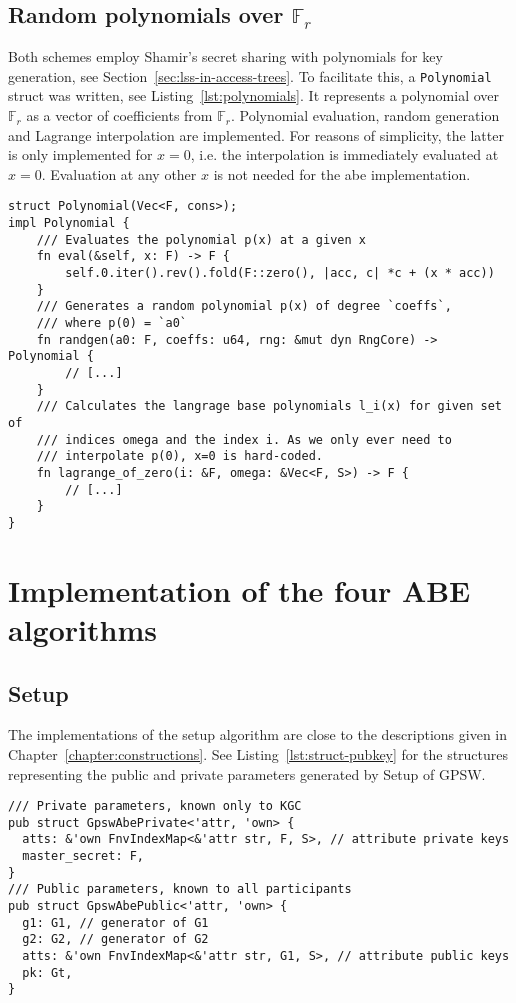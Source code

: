 \subsection{Random polynomials over $\mathbb{F}_r$}

Both schemes employ Shamir's secret sharing with polynomials for key generation, see Section~\ref{sec:lss-in-access-trees}.
To facilitate this, a \texttt{Polynomial} struct was written, see Listing~\ref{lst:polynomials}.
It represents a polynomial over $\mathbb{F}_r$ as a vector of coefficients from $\mathbb{F}_r$.
Polynomial evaluation, random generation and Lagrange interpolation are implemented.
For reasons of simplicity, the latter is only implemented for $x=0$, i.e. the interpolation is immediately evaluated at $x=0$.
Evaluation at any other $x$ is not needed for the \acrshort{abe} implementation.

\begin{lstlisting}[caption={Implementation of polynomials over $\mathbb{F}_r$},label={lst:polynomials}]
struct Polynomial(Vec<F, cons>);
impl Polynomial {
    /// Evaluates the polynomial p(x) at a given x
    fn eval(&self, x: F) -> F {
        self.0.iter().rev().fold(F::zero(), |acc, c| *c + (x * acc))
    }
    /// Generates a random polynomial p(x) of degree `coeffs`,
    /// where p(0) = `a0`
    fn randgen(a0: F, coeffs: u64, rng: &mut dyn RngCore) -> Polynomial {
        // [...]
    }
    /// Calculates the langrage base polynomials l_i(x) for given set of
    /// indices omega and the index i. As we only ever need to
    /// interpolate p(0), x=0 is hard-coded.
    fn lagrange_of_zero(i: &F, omega: &Vec<F, S>) -> F {
        // [...]
    }
}
\end{lstlisting}

\section{Implementation of the four ABE algorithms}
\subsection{Setup}
The implementations of the setup algorithm are close to the descriptions given in Chapter~\ref{chapter:constructions}.
See Listing~\ref{lst:struct-pubkey} for the structures representing the public and private parameters generated by Setup of GPSW.

\begin{lstlisting}[caption={Private and public system parameters structs for GPSW},label={lst:struct-pubkey}]
/// Private parameters, known only to KGC
pub struct GpswAbePrivate<'attr, 'own> {
  atts: &'own FnvIndexMap<&'attr str, F, S>, // attribute private keys
  master_secret: F,
}
/// Public parameters, known to all participants
pub struct GpswAbePublic<'attr, 'own> {
  g1: G1, // generator of G1
  g2: G2, // generator of G2
  atts: &'own FnvIndexMap<&'attr str, G1, S>, // attribute public keys
  pk: Gt,
}
\end{lstlisting}

